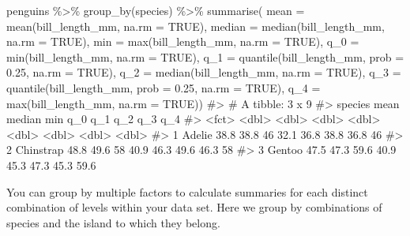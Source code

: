 \documentclass[
  letterpaper,
  DIV=11,
  numbers=noendperiod]{scrreprt}
\newenvironment{Shaded}{\begin{snugshade}}{\end{snugshade}}
\newcommand{\AttributeTok}[1]{\textcolor[rgb]{0.40,0.45,0.13}{#1}}
\newcommand{\CommentTok}[1]{\textcolor[rgb]{0.37,0.37,0.37}{#1}}
\newcommand{\ConstantTok}[1]{\textcolor[rgb]{0.56,0.35,0.01}{#1}}
\newcommand{\FloatTok}[1]{\textcolor[rgb]{0.68,0.00,0.00}{#1}}
\newcommand{\FunctionTok}[1]{\textcolor[rgb]{0.28,0.35,0.67}{#1}}
\newcommand{\NormalTok}[1]{\textcolor[rgb]{0.00,0.23,0.31}{#1}}
\newcommand{\SpecialCharTok}[1]{\textcolor[rgb]{0.37,0.37,0.37}{#1}}
\begin{document}
\begin{Shaded}
\begin{Highlighting}[]
\NormalTok{penguins }\SpecialCharTok{\%\textgreater{}\%} 
  \FunctionTok{group\_by}\NormalTok{(species) }\SpecialCharTok{\%\textgreater{}\%}
  \FunctionTok{summarise}\NormalTok{(}
    \AttributeTok{mean =} \FunctionTok{mean}\NormalTok{(bill\_length\_mm, }\AttributeTok{na.rm =} \ConstantTok{TRUE}\NormalTok{),}
    \AttributeTok{median =} \FunctionTok{median}\NormalTok{(bill\_length\_mm, }\AttributeTok{na.rm =} \ConstantTok{TRUE}\NormalTok{),}
    \AttributeTok{min =} \FunctionTok{max}\NormalTok{(bill\_length\_mm, }\AttributeTok{na.rm =} \ConstantTok{TRUE}\NormalTok{),}
    \AttributeTok{q\_0 =} \FunctionTok{min}\NormalTok{(bill\_length\_mm, }\AttributeTok{na.rm =} \ConstantTok{TRUE}\NormalTok{),}
    \AttributeTok{q\_1 =} \FunctionTok{quantile}\NormalTok{(bill\_length\_mm, }\AttributeTok{prob =} \FloatTok{0.25}\NormalTok{, }\AttributeTok{na.rm =} \ConstantTok{TRUE}\NormalTok{),}
    \AttributeTok{q\_2 =} \FunctionTok{median}\NormalTok{(bill\_length\_mm, }\AttributeTok{na.rm =} \ConstantTok{TRUE}\NormalTok{),}
    \AttributeTok{q\_3 =} \FunctionTok{quantile}\NormalTok{(bill\_length\_mm, }\AttributeTok{prob =} \FloatTok{0.25}\NormalTok{, }\AttributeTok{na.rm =} \ConstantTok{TRUE}\NormalTok{),}
    \AttributeTok{q\_4 =} \FunctionTok{max}\NormalTok{(bill\_length\_mm, }\AttributeTok{na.rm =} \ConstantTok{TRUE}\NormalTok{))}
\CommentTok{\#\textgreater{} \# A tibble: 3 x 9}
\CommentTok{\#\textgreater{}   species    mean median   min   q\_0   q\_1   q\_2   q\_3   q\_4}
\CommentTok{\#\textgreater{}   \textless{}fct\textgreater{}     \textless{}dbl\textgreater{}  \textless{}dbl\textgreater{} \textless{}dbl\textgreater{} \textless{}dbl\textgreater{} \textless{}dbl\textgreater{} \textless{}dbl\textgreater{} \textless{}dbl\textgreater{} \textless{}dbl\textgreater{}}
\CommentTok{\#\textgreater{} 1 Adelie     38.8   38.8  46    32.1  36.8  38.8  36.8  46  }
\CommentTok{\#\textgreater{} 2 Chinstrap  48.8   49.6  58    40.9  46.3  49.6  46.3  58  }
\CommentTok{\#\textgreater{} 3 Gentoo     47.5   47.3  59.6  40.9  45.3  47.3  45.3  59.6}
\end{Highlighting}
\end{Shaded}

You can group by multiple factors to calculate summaries for each
distinct combination of levels within your data set. Here we group by
combinations of species and the island to which they belong.
\end{document}
